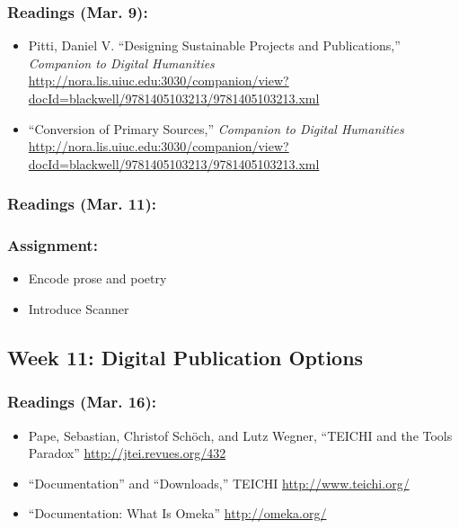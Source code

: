 \documentclass[]{article}
\begin{document}
\subsubsection{Readings (Mar. 9):}\label{readings-mar.-9}

\begin{itemize}
\itemsep1pt\parskip0pt
\item
  Pitti, Daniel V. ``Designing Sustainable Projects and Publications,''
  \emph{Companion to Digital Humanities}
  \url{http://nora.lis.uiuc.edu:3030/companion/view?docId=blackwell/9781405103213/9781405103213.xml}
\item
  ``Conversion of Primary Sources,'' \emph{Companion to Digital
  Humanities}
  \url{http://nora.lis.uiuc.edu:3030/companion/view?docId=blackwell/9781405103213/9781405103213.xml}
\end{itemize}

\subsubsection{Readings (Mar. 11):}\label{readings-mar.-11}

\subsubsection{Assignment:}\label{assignment-8}

\begin{itemize}
\itemsep1pt\parskip0pt
\item
  Encode prose and poetry
\item
  Introduce Scanner
\end{itemize}

\subsection{Week 11: Digital Publication
Options}\label{week-11-digital-publication-options}

\subsubsection{Readings (Mar. 16):}\label{readings-mar.-16}

\begin{itemize}
\itemsep1pt\parskip0pt
\item
  Pape, Sebastian, Christof Schöch, and Lutz Wegner, ``TEICHI and the
  Tools Paradox'' \url{http://jtei.revues.org/432}
\item
  ``Documentation'' and ``Downloads,'' TEICHI
  \url{http://www.teichi.org/}
\item
  ``Documentation: What Is Omeka'' \url{http://omeka.org/}
\end{itemize}
\end{document}
